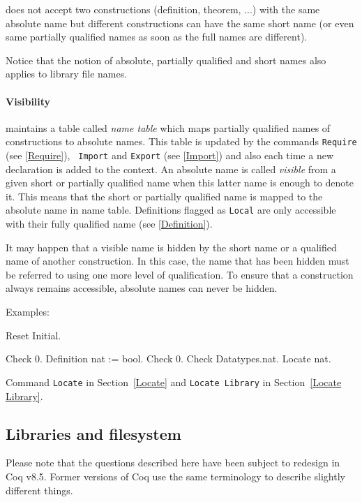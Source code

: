 {\Coq} does not accept two constructions (definition, theorem, ...)
with the same absolute name but different constructions can have the
same short name (or even same partially qualified names as soon as the
full names are different).

Notice that the notion of absolute, partially qualified and
short names also applies to library file names.

\paragraph{Visibility}

{\Coq} maintains a table called {\it name table} which maps partially
qualified names of constructions to absolute names. This table is
updated by the commands {\tt Require} (see \ref{Require}), {\tt
Import} and {\tt Export} (see \ref{Import}) and also each time a new
declaration is added to the context. An absolute name is called {\it
visible} from a given short or partially qualified name when this
latter name is enough to denote it. This means that the short or
partially qualified name is mapped to the absolute name in {\Coq} name
table. Definitions flagged as {\tt Local} are only accessible with their
fully qualified name (see \ref{Definition}).

It may happen that a visible name is hidden by the short name or a
qualified name of another construction. In this case, the name that
has been hidden must be referred to using one more level of
qualification. To ensure that a construction always remains
accessible, absolute names can never be hidden.

Examples:
\begin{coq_eval}
Reset Initial.
\end{coq_eval}
\begin{coq_example}
Check 0.
Definition nat := bool.
Check 0.
Check Datatypes.nat.
Locate nat.
\end{coq_example}

\SeeAlso Command {\tt Locate} in Section~\ref{Locate} and {\tt Locate
Library} in Section~\ref{Locate Library}.

\subsection{Libraries and filesystem\label{loadpath}
 }

Please note that the questions described here have been subject to
redesign in Coq v8.5. Former versions of Coq use the same terminology
to describe slightly different things.


